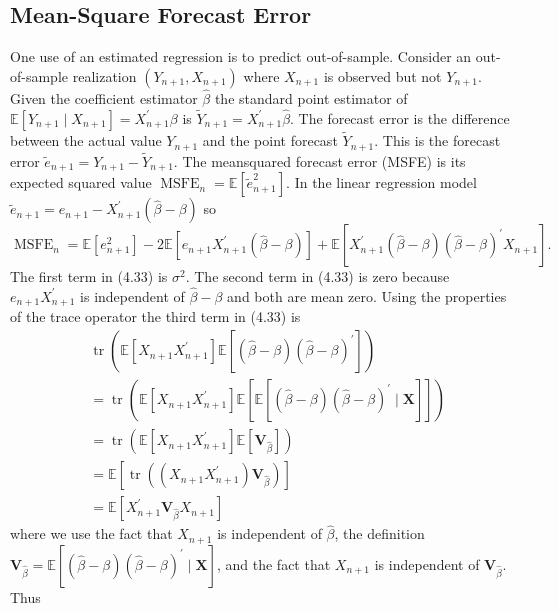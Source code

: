 \documentclass[10pt]{article}
\begin{document}
\subsection{Mean-Square Forecast Error}
One use of an estimated regression is to predict out-of-sample. Consider an out-of-sample realization $\left(Y_{n+1}, X_{n+1}\right)$ where $X_{n+1}$ is observed but not $Y_{n+1}$. Given the coefficient estimator $\widehat{\beta}$ the standard point estimator of $\mathbb{E}\left[Y_{n+1} \mid X_{n+1}\right]=X_{n+1}^{\prime} \beta$ is $\widetilde{Y}_{n+1}=X_{n+1}^{\prime} \widehat{\beta}$. The forecast error is the difference between the actual value $Y_{n+1}$ and the point forecast $\widetilde{Y}_{n+1}$. This is the forecast error $\widetilde{e}_{n+1}=Y_{n+1}-\widetilde{Y}_{n+1}$. The meansquared forecast error (MSFE) is its expected squared value $\operatorname{MSFE}_{n}=\mathbb{E}\left[\widetilde{e}_{n+1}^{2}\right]$. In the linear regression model $\widetilde{e}_{n+1}=e_{n+1}-X_{n+1}^{\prime}(\widehat{\beta}-\beta)$ so
$$
\operatorname{MSFE}_{n}=\mathbb{E}\left[e_{n+1}^{2}\right]-2 \mathbb{E}\left[e_{n+1} X_{n+1}^{\prime}(\widehat{\beta}-\beta)\right]+\mathbb{E}\left[X_{n+1}^{\prime}(\widehat{\beta}-\beta)(\widehat{\beta}-\beta)^{\prime} X_{n+1}\right] .
$$
The first term in (4.33) is $\sigma^{2}$. The second term in (4.33) is zero because $e_{n+1} X_{n+1}^{\prime}$ is independent of $\widehat{\beta}-\beta$ and both are mean zero. Using the properties of the trace operator the third term in (4.33) is
$$
\begin{aligned}
&\operatorname{tr}\left(\mathbb{E}\left[X_{n+1} X_{n+1}^{\prime}\right] \mathbb{E}\left[(\widehat{\beta}-\beta)(\widehat{\beta}-\beta)^{\prime}\right]\right) \\
&=\operatorname{tr}\left(\mathbb{E}\left[X_{n+1} X_{n+1}^{\prime}\right] \mathbb{E}\left[\mathbb{E}\left[(\widehat{\beta}-\beta)(\widehat{\beta}-\beta)^{\prime} \mid \boldsymbol{X}\right]\right]\right) \\
&=\operatorname{tr}\left(\mathbb{E}\left[X_{n+1} X_{n+1}^{\prime}\right] \mathbb{E}\left[\boldsymbol{V}_{\widehat{\beta}}\right]\right) \\
&=\mathbb{E}\left[\operatorname{tr}\left(\left(X_{n+1} X_{n+1}^{\prime}\right) \boldsymbol{V}_{\widehat{\beta}}\right)\right] \\
&=\mathbb{E}\left[X_{n+1}^{\prime} \boldsymbol{V}_{\widehat{\beta}} X_{n+1}\right]
\end{aligned}
$$
where we use the fact that $X_{n+1}$ is independent of $\widehat{\beta}$, the definition $\boldsymbol{V}_{\widehat{\beta}}=\mathbb{E}\left[(\widehat{\beta}-\beta)(\widehat{\beta}-\beta)^{\prime} \mid \boldsymbol{X}\right]$, and the fact that $X_{n+1}$ is independent of $\boldsymbol{V}_{\widehat{\beta}}$. Thus
\end{document}
